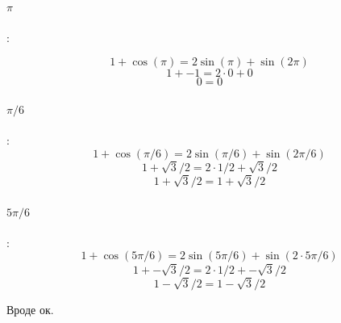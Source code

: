 \documentclass{article}
\begin{document}
\paragraph{$\pi$}:

$$1+\cos(\pi)=2\sin(\pi)+\sin(2\pi)$$
$$1+-1=2\cdot{}0+0$$
$$0=0$$

\paragraph{$\pi/6$}:
$$1+\cos(\pi/6)=2\sin(\pi/6)+\sin(2\pi/6)$$
$$1+\sqrt{3}/2=2\cdot{}1/2+\sqrt{3}/2$$
$$1+\sqrt{3}/2=1+\sqrt{3}/2$$

\paragraph{$5\pi/6$}:
$$1+\cos(5\pi/6)=2\sin(5\pi/6)+\sin(2\cdot{}5\pi/6)$$
$$1+-\sqrt{3}/2=2\cdot{}1/2+-\sqrt{3}/2$$
$$1-\sqrt{3}/2=1-\sqrt{3}/2$$

Вроде ок.
\end{document}
